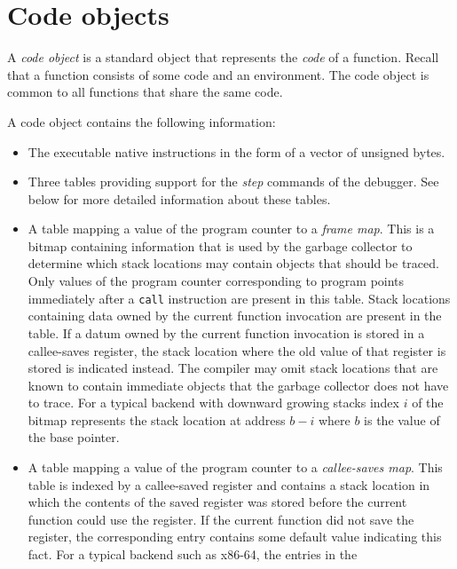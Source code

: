 \section{Code objects}
\label{data-representation-code-objects}

A \emph{code object} is a standard object that represents the
\emph{code} of a function.  Recall that a function consists of some
code and an environment.  The code object is common to all functions
that share the same code.

A code object contains the following information:

\begin{itemize}
\item The executable native instructions in the form of a vector of
  unsigned bytes.
\item Three tables providing support for the \emph{step} commands of
  the debugger.  See below for more detailed information about these
  tables.
\item A table mapping a value of the program counter to a \emph{frame
  map}.  This is a bitmap containing information that is used by the
  garbage collector to determine which stack locations may contain
  \commonlisp{} objects that should be traced.  Only values of the
  program counter corresponding to program points immediately after a
  \texttt{call} instruction are present in this table.  Stack
  locations containing data owned by the current function invocation
  are present in the table.  If a datum owned by the current function
  invocation is stored in a callee-saves register, the stack location
  where the old value of that register is stored is indicated instead.
  The compiler may omit stack locations that are known to contain
  immediate \commonlisp{} objects that the garbage collector does not
  have to trace.  For a typical backend with downward growing stacks 
  index $i$ of the bitmap
  represents the stack location at address $b-i$ where $b$ is the
    value of the base pointer.
\item A table mapping a value of the program counter to a
  \emph{callee-saves map}.  This table is indexed by a callee-saved
  register and contains a stack location in which the contents of the
  saved register was stored before the current function could use the
  register.  If the current function did not save the register, the
  corresponding entry contains some default value indicating this
  fact.  For a typical backend such as x86-64, the entries in the

\end{itemize}
